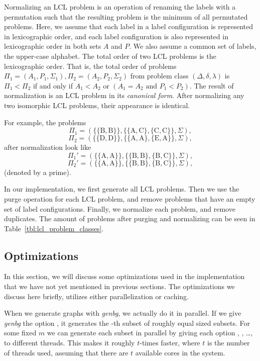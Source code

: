 Normalizing an LCL problem is an operation of renaming the labels with a permutation such that the resulting problem is the minimum of all permutated problems.
Here, we assume that each label in a label configuration is represented in lexicographic order, and each label configuration is also represented in lexicographic order in both sets $A$ and $P$.
We also assume a common set of labels, the upper-case alphabet.
The total order of two LCL problems is the lexicographic order.
That is, the total order of problems $\Pi_1=(A_1, P_1, \Sigma_1), \Pi_2=(A_2, P_2, \Sigma_2)$ from problem class $(\Delta, \delta, \lambda)$ is $\Pi_1 < \Pi_2$ if and only if $A_1 < A_2$ or $(A_1 = A_2 \text{ and } P_1 < P_2)$.
The result of normalization is an LCL problem in its \emph{canonical form}.
After normalizing any two isomorphic LCL problems, their appearance is identical.

For example, the problems
$$\Pi_1=(\{\{\mathrm{B, B}\}\}, \{\{\mathrm{A, C}\}, \{\mathrm{C,C\}}\}, \Sigma),$$
$$\Pi_2=(\{\{\mathrm{D, D}\}\}, \{\{\mathrm{A,A\}},\{\mathrm{E, A}\}\}, \Sigma),$$ after normalization look like
$$\Pi_1'=(\{\{\mathrm{A, A}\}\}, \{\{\mathrm{B, B}\},\{\mathrm{B, C}\}\}, \Sigma),$$
$$\Pi_2'=(\{\{\mathrm{A, A}\}\}, \{\{\mathrm{B, B}\},\{\mathrm{B, C}\}\}, \Sigma),$$ (denoted by a prime).

In our implementation, we first generate all LCL problems.
Then we use the purge operation for each LCL problem, and remove problems that have an empty set of label configurations.
Finally, we normalize each problem, and remove duplicates.
The amount of problems after purging and normalizing can be seen in Table~\ref{tbl:lcl_problem_classes}.



\subsection{Optimizations} \label{sec:implementation:optimizations}
In this section, we will discuss some optimizations used in the implementation that we have not yet mentioned in previous sections.
The optimizations we discuss here briefly, utilizes either parallelization or caching.

When we generate graphs with \emph{genbg}, we actually do it in parallel.
If we give \emph{genbg} the option , it generates the -th subset of  roughly equal sized subsets.
For some fixed $m$ we can generate each subset in parallel by giving each option , , \dots,  to different threads.
This makes it roughly $t$-times faster, where $t$ is the number of threads used, assuming that there are $t$ available cores in the system.

